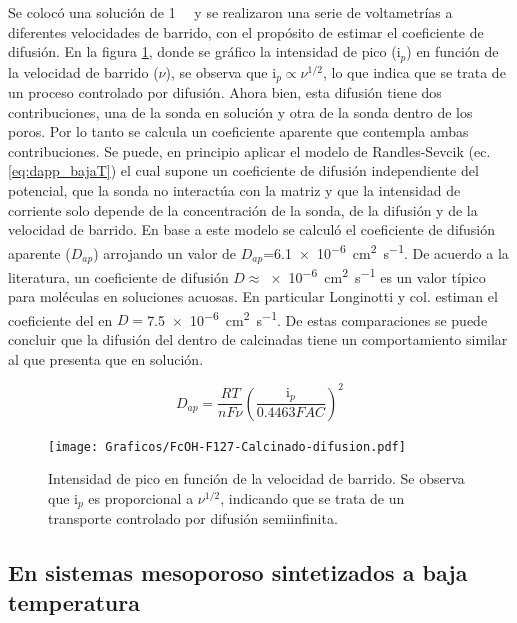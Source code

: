 	 Se colocó una solución de \fc\space \SI{1}{\milli\Molar} y se realizaron una serie de voltametrías a diferentes velocidades de barrido, con el propósito de estimar el coeficiente de difusión. En la figura \ref{fig:difusion_calcinado}, donde se gráfico la intensidad de pico (i$_p$) en función de la velocidad de barrido ($\nu$), se observa que $\text{i}_p \propto \nu^{1/2}$, lo que indica que se trata de un proceso controlado por difusión. Ahora bien, esta difusión tiene dos contribuciones, una de la sonda en solución y otra de la sonda dentro de los poros. Por lo tanto se calcula un coeficiente aparente que contempla ambas contribuciones. Se puede, en principio aplicar el modelo de Randles-Sevcik (ec. \ref{eq:dapp_bajaT}) el cual supone un coeficiente de difusión independiente del potencial, que la sonda no interactúa con la matriz y que la intensidad de corriente solo depende de la concentración de la sonda, de la difusión y de la velocidad de barrido. En base a este modelo se calculó el coeficiente de difusión aparente ($D_{ap}$) arrojando un valor de $D_{ap}$=\SI{6,1e-6}{\square\cm\per\second}. De acuerdo a la literatura, un coeficiente de difusión $D\approx$\SI{e-6}{\square\cm\per\second} es un valor típico para moléculas en soluciones acuosas. \cite{koryta1993,Otal2006} En particular Longinotti y col.\cite{longinotti2007} estiman el coeficiente del \fc\space en $D=$\SI{7,5e-6}{\square\cm\per\second}. De estas comparaciones se puede concluir que la difusión del \fc\space dentro de \pdmF\space calcinadas tiene un comportamiento similar al que presenta que en solución.


		 \begin{equation}
					D_{ap}=\frac{RT}{nF\nu}\left(\frac{\text{i}_p}{0.4463FAC}\right)^2
					\label{eq:dapp_bajaT}
			\end{equation}  
	 

		    \begin{figure}[h!]
				\centering
		 	    \texttt{[image: Graficos/FcOH-F127-Calcinado-difusion.pdf]}
		        \caption[i$_p$ en función de $\nu$ para \fc\space]{Intensidad de pico en función de la velocidad de barrido. Se observa que $\text{i}_p$ es proporcional a $\nu ^{1/2}$, indicando que se trata de un transporte controlado por difusión semiinfinita.}
		        \label{fig:difusion_calcinado}
		      	\end{figure}
	      	
	\subsection{En sistemas mesoporoso sintetizados a baja temperatura}

